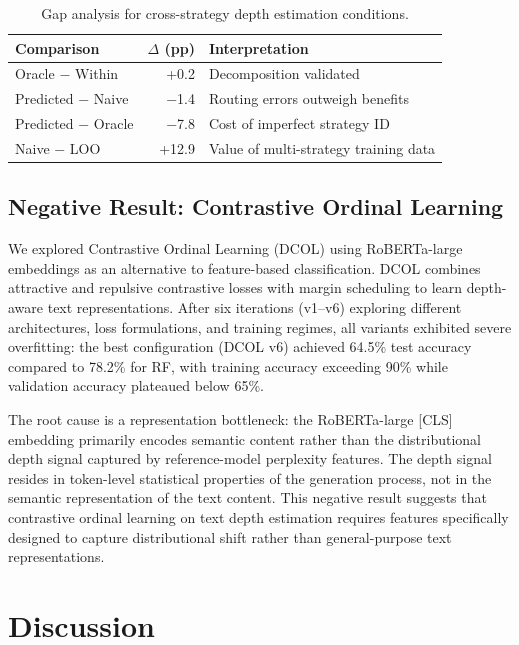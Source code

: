 \documentclass[11pt,a4paper]{article}
\begin{document}
\begin{table}[t]
\centering
\caption{Gap analysis for cross-strategy depth estimation conditions.}
\label{tab:gap-analysis}
\begin{tabular}{lrl}
\toprule
\textbf{Comparison} & \textbf{$\Delta$ (pp)} & \textbf{Interpretation} \\
\midrule
Oracle $-$ Within & +0.2 & Decomposition validated \\
Predicted $-$ Naive & $-$1.4 & Routing errors outweigh benefits \\
Predicted $-$ Oracle & $-$7.8 & Cost of imperfect strategy ID \\
Naive $-$ LOO & +12.9 & Value of multi-strategy training data \\
\bottomrule
\end{tabular}
\end{table}

\subsection{Negative Result: Contrastive Ordinal Learning}

We explored Contrastive Ordinal Learning (DCOL) using RoBERTa-large embeddings as an alternative to feature-based classification. DCOL combines attractive and repulsive contrastive losses with margin scheduling to learn depth-aware text representations. After six iterations (v1--v6) exploring different architectures, loss formulations, and training regimes, all variants exhibited severe overfitting: the best configuration (DCOL v6) achieved 64.5\% test accuracy compared to 78.2\% for RF, with training accuracy exceeding 90\% while validation accuracy plateaued below 65\%.

The root cause is a representation bottleneck: the RoBERTa-large [CLS] embedding primarily encodes semantic content rather than the distributional depth signal captured by reference-model perplexity features. The depth signal resides in token-level statistical properties of the generation process, not in the semantic representation of the text content. This negative result suggests that contrastive ordinal learning on text depth estimation requires features specifically designed to capture distributional shift rather than general-purpose text representations.

\section{Discussion}
\end{document}
